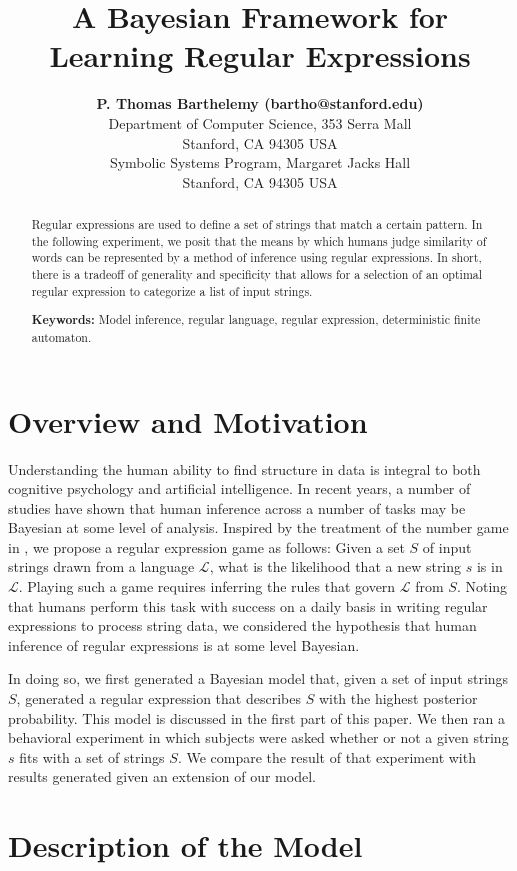 \documentclass[10pt,letterpaper]{article}
\title{A Bayesian Framework for Learning Regular Expressions}
\author{{\large \bf{P. Thomas Barthelemy} (bartho@stanford.edu)} \\
  Department of Computer Science, 353 Serra Mall \\
  Stanford, CA 94305 USA
  \AND {\large \bf Nicholas Borg (nickborg@stanford.edu)} \\
  Symbolic Systems Program, Margaret Jacks Hall \\
  Stanford, CA 94305 USA}
\begin{document}
\maketitle


\begin{abstract}
Regular expressions are used to define a set of strings that match a certain pattern. In the following experiment, we posit that the means by which humans judge similarity of words can be represented by a method of inference using regular expressions. In short, there is a tradeoff of generality and specificity that allows for a selection of an optimal regular expression to categorize a list of input strings.

\textbf{Keywords:} 
Model inference, regular language, regular expression, deterministic finite automaton.
\end{abstract}


\section{Overview and Motivation}
Understanding the human ability to find structure in data is integral to both cognitive psychology and artificial intelligence. In recent years, a number of studies have shown that human inference across a number of tasks may be Bayesian at some level of analysis. Inspired by the treatment of the number game in , we propose a regular expression game as follows: Given a set $S$ of input strings drawn from a language $\mathcal{L}$, what is the likelihood that a new string $s$ is in $\mathcal{L}$. Playing such a game requires inferring the rules that govern $\mathcal{L}$ from $S$. Noting that humans perform this task  with success on a daily basis in writing regular expressions to process string data, we considered the hypothesis that human inference of regular expressions is at some level Bayesian. 

In doing so, we first generated a Bayesian model that, given a set of input strings $S$, generated a regular expression that describes $S$ with the highest posterior probability. This model is discussed in the first part of this paper. We then ran a behavioral experiment in which subjects were asked whether or not a given string $s$ fits with a set of strings $S$. We compare the result of that experiment with results generated given an extension of our model.  

\section{Description of the Model}
\end{document}
